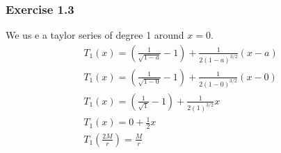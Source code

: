 \documentclass[reprint,english,notitlepage]{revtex4-2}
\begin{document}
        \subsubsection{Exercise 1.3}\label{subsec:exercise-1.3}
            We us e a taylor series of degree 1 around $x = 0$.            
            \begin{align}
                T_1(x) = \left(\frac{1}{\sqrt{1-a}}-1 \right) + \frac{1}{2(1-a)^{3/2}}(x-a)\\
                T_1(x) = \left(\frac{1}{\sqrt{1-0}}-1 \right) + \frac{1}{2(1-0)^{3/2}}(x-0)\\
                T_1(x) = \left(\frac{1}{\sqrt{1}}-1 \right) + \frac{1}{2(1)^{3/2}}x\\
                T_1(x) = 0 + \frac{1}{2}x\\
                T_1\left(\frac{2M}{r}\right) = \frac{M}{r}
            \end{align}
\clearpage
\newpage
\printbibliography
\end{document}
